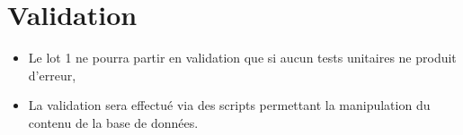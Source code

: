 \section{Validation}	
	\begin{itemize}
		\item Le lot 1 ne pourra partir en validation que si aucun tests unitaires ne produit d'erreur,
		\item La validation sera effectué via des scripts permettant la manipulation du contenu de la base de données.
	\end{itemize}
	
